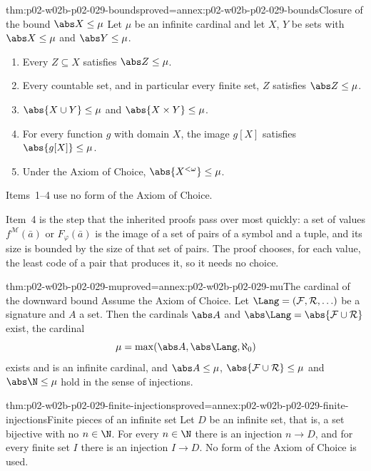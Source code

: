 \begin{hblemma}{thm:p02-w02b-p02-029-bounds}{proved=annex:p02-w02b-p02-029-bounds}{Closure of the bound \(\abs X\leq\mu\)}
Let \(\mu\) be an infinite cardinal and let \(X\), \(Y\) be sets with
\(\abs X\leq\mu\) and \(\abs Y\leq\mu\).
\begin{enumerate}
  \item Every \(Z\subseteq X\) satisfies \(\abs Z\leq\mu\).
  \item Every countable set, and in particular every finite set, \(Z\)
        satisfies \(\abs Z\leq\mu\).
  \item \(\abs{X\cup Y}\leq\mu\) and \(\abs{X\times Y}\leq\mu\).
  \item For every function \(g\) with domain \(X\), the image
        \(g[X]\) satisfies \(\abs{g[X]}\leq\mu\).
  \item Under the Axiom of Choice, \(\abs{X^{<\omega}}\leq\mu\).
\end{enumerate}
Items~1--4 use no form of the Axiom of Choice.
\end{hblemma}

Item~4 is the step that the inherited proofs pass over most quickly: a set
of values \(f^{\mathcal M}(\bar a)\) or \(F_\varphi(\bar a)\) is the image of
a set of pairs of a symbol and a tuple, and its size is bounded by the size
of that set of pairs. The proof chooses, for each value, the least code of a
pair that produces it, so it needs no choice.

\begin{hblemma}{thm:p02-w02b-p02-029-mu}{proved=annex:p02-w02b-p02-029-mu}{The cardinal of the downward bound}
Assume the Axiom of Choice. Let \(\Lang=(\mathcal F,\mathcal R,\ldots)\) be a
signature and \(A\) a set. Then the cardinals \(\abs A\) and
\(\abs\Lang=\abs{\mathcal F\cup\mathcal R}\) exist, the cardinal
\[
  \mu=\max(\abs A,\abs\Lang,\aleph_0)
\]
exists and is an infinite cardinal, and \(\abs A\leq\mu\),
\(\abs{\mathcal F\cup\mathcal R}\leq\mu\) and \(\abs\N\leq\mu\) hold in the
sense of injections.
\end{hblemma}

\begin{hblemma}{thm:p02-w02b-p02-029-finite-injections}{proved=annex:p02-w02b-p02-029-finite-injections}{Finite pieces of an infinite set}
Let \(D\) be an infinite set, that is, a set bijective with no \(n\in\N\).
For every \(n\in\N\) there is an injection \(n\to D\), and for every finite
set \(I\) there is an injection \(I\to D\). No form of the Axiom of Choice
is used.
\end{hblemma}

